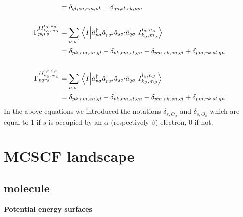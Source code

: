 \documentclass[11pt,a4paper]{article}
\newcommand{\kron}[1]{\delta_{#1}}
\newcommand{\oa}{O_{\alpha}}
\newcommand{\ob}{O_{\beta}}
\begin{document}
\begin{subequations}
\begin{align}
                       &= \kron{ql,sn,rm,pk}+\kron{qn,sl,rk,pm}\notag\\
    \notag \\
    \Gamma_{pqrs}^{II_{k_\alpha,m_\alpha}^{l_\alpha,n_\alpha}} &= \sum_{\sigma,\sigma'}\mel{I}{\hat{a}_{p\sigma}^\dagger\hat{a}_{r\sigma'}^\dagger\hat{a}_{s\sigma'}\hat{a}_{q\sigma}}{I_{k_\alpha,m_\alpha}^{l_\alpha,n_\alpha}} \\
                       &= \kron{pk,rm,sn,ql} - \kron{pk,rm,sl,qn} - \kron{pm,rk,sn,ql} + \kron{pm,rk,sl,qn} \notag\\
    \notag \\
    \Gamma_{pqrs}^{II_{k_\beta,m_\beta}^{l_\beta,n_\beta}} &= \sum_{\sigma,\sigma'}\mel{I}{\hat{a}_{p\sigma}^\dagger\hat{a}_{r\sigma'}^\dagger\hat{a}_{s\sigma'}\hat{a}_{q\sigma}}{I_{k_\beta,m_\beta}^{l_\beta,n_\beta}} \\
    &= \kron{pk,rm,sn,ql} - \kron{pk,rm,sl,qn} - \kron{pm,rk,sn,ql} + \kron{pm,rk,sl,qn} \notag
  \end{align}
\end{subequations}
In the above equations we introduced the notations $\kron{s,\oa}$ and $\kron{s,\ob}$ which are equal to 1 if $s$ is occupied by an $\alpha$ (respectively $\beta$) electron, 0 if not.


\section{MCSCF landscape}
\label{sec:MCSCFland}

\subsection{ molecule}

\textbf{Potential energy surfaces}
\end{document}
